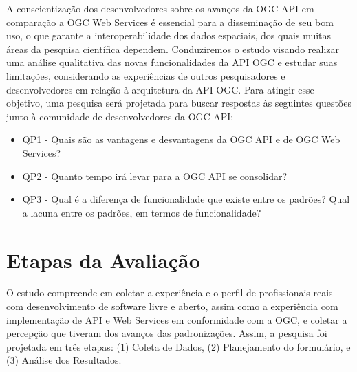 A conscientização dos desenvolvedores sobre os avanços da OGC API em comparação a OGC Web Services é essencial para a disseminação de seu bom uso, o que garante a interoperabilidade dos dados espaciais, dos quais muitas áreas da pesquisa científica dependem. 
Conduziremos o estudo visando realizar uma análise qualitativa das novas funcionalidades da API OGC e estudar suas limitações, considerando as experiências de outros pesquisadores e desenvolvedores em relação à arquitetura da API OGC. 
Para atingir esse objetivo, uma pesquisa será projetada para buscar respostas às seguintes questões junto à comunidade de desenvolvedores da OGC API:

\begin{itemize}
    \item QP1 - Quais são as vantagens e desvantagens da OGC API e de OGC Web Services?
    \item QP2 - Quanto tempo irá levar para a OGC API se consolidar?
    \item QP3 - Qual é a diferença de funcionalidade que existe entre os padrões?  Qual a lacuna entre os padrões, em termos de funcionalidade?
\end{itemize}

\section{Etapas da Avaliação}

O estudo compreende em coletar a experiência e o perfil de profissionais reais com desenvolvimento de software livre e aberto, assim como a experiência com implementação de API e Web Services em conformidade com a OGC, e coletar a percepção que tiveram dos avanços das padronizações. Assim, a pesquisa foi projetada em três etapas: (1) Coleta de Dados, (2) Planejamento do formulário, e (3) Análise dos Resultados.


